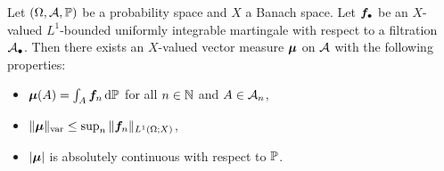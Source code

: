 \begin{prop}\label{prop:martingale-measure} 
  Let $(\Omega,\mc{A},\P)$ be a probability space and $X$ a Banach space.
  Let $\mb{f}_{\bullet}$ be an $X$-valued $L^1$-bounded uniformly integrable martingale with respect to a filtration $\mc{A}_{\bullet}$.
  Then there exists an $X$-valued vector measure $\mb{\mu}$ on $\mc{A}$ with the following properties:
  \begin{itemize}
  \item $\mb{\mu}(A) = \int_{A} \mb{f}_n \, \dd\P$ for all $n \in \N$ and $A \in \mc{A}_{n}$,
  \item $\|\mb{\mu}\|_{\var} \leq \sup_{n} \|\mb{f}_n\|_{L^1(\Omega;X)}$,
  \item $|\mb{\mu}|$ is absolutely continuous with respect to $\P$.
  \end{itemize}
\end{prop}

